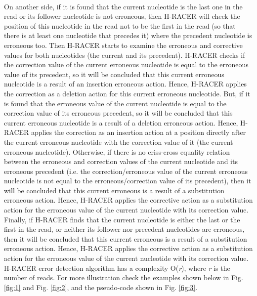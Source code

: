 \documentclass{llncs}
\begin{document}
\\
On another side, if it is found that the current nucleotide is the last one in the read or its follower nucleotide is not erroneous, then H-RACER will check the position of this nucleotide in the read not to be the first in the read (so that there is at least one nucleotide that precedes it) where the precedent nucleotide is erroneous too. Then H-RACER starts to examine the erroneous and corrective values for both nucleotides (the current and its precedent). H-RACER checks if the correction value of the current erroneous nucleotide is equal to the erroneous value of its precedent, so it will be concluded that this current erroneous nucleotide is a result of an insertion erroneous action. Hence, H-RACER applies the correction as a deletion action for this current erroneous nucleotide. But, if it is found that the erroneous value of the current nucleotide is equal to the correction value of its erroneous precedent, so it will be concluded that this current erroneous nucleotide is a result of a deletion erroneous action. Hence, H-RACER applies the correction as an insertion action at a position directly after the current erroneous nucleotide with the correction value of it (the current erroneous nucleotide). Otherwise, if there is no criss-cross equality relation between the erroneous and correction values of the current nucleotide and its erroneous precedent (i.e. the correction/erroneous value of the current erroneous nucleotide is not equal to the erroneous/correction value of its precedent), then it will be concluded that this current erroneous is a result of a substitution erroneous action. Hence, H-RACER applies the corrective action as a substitution action for the erroneous value of the current nucleotide with its correction value.
\\
Finally, if H-RACER finds that the current nucleotide is either the last or the first in the read, or neither its follower nor precedent nucleotides are erroneous, then it will be concluded that this current erroneous is a result of a substitution erroneous action. Hence, H-RACER applies the corrective action as a substitution action for the erroneous value of the current nucleotide with its correction value.
\\
H-RACER error detection algorithm has a complexity O(\textit{r}), where \textit{r} is the number of reads. For more illustration check the examples shown below in Fig. \ref{fig:1} and Fig. \ref{fig:2}, and the pseudo-code shown in Fig. \ref{fig:3}.
\end{document}
